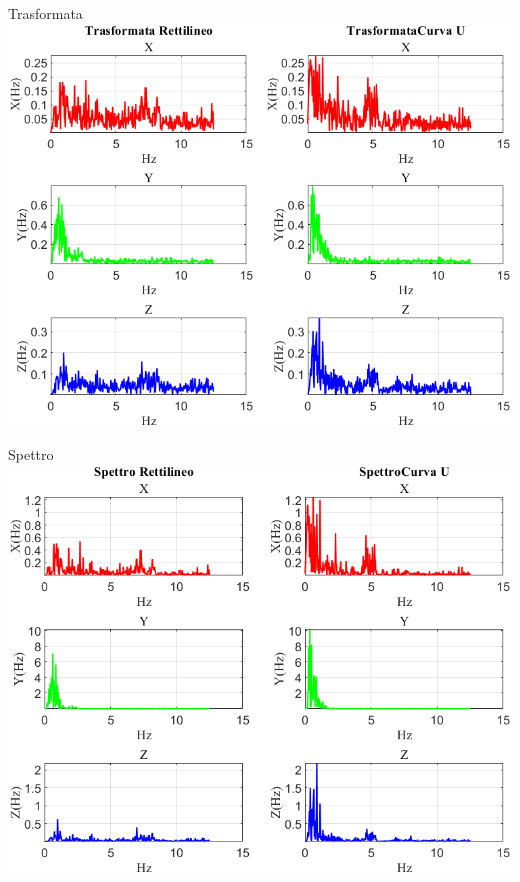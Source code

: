 \documentclass[beamer]{standalone}
\begin{document}
%	
%	
	
	\begin{frame}{{Trasformata}}
		\centering\includegraphics[height=.8\textheight]{figure/Mag/Trasformata/Trasformata}
	\end{frame}
	
	\begin{frame}{{Spettro}}
		\centering\includegraphics[height=.8\textheight]{figure/Mag/Trasformata/Spettro}
	\end{frame}
	
\end{document}
